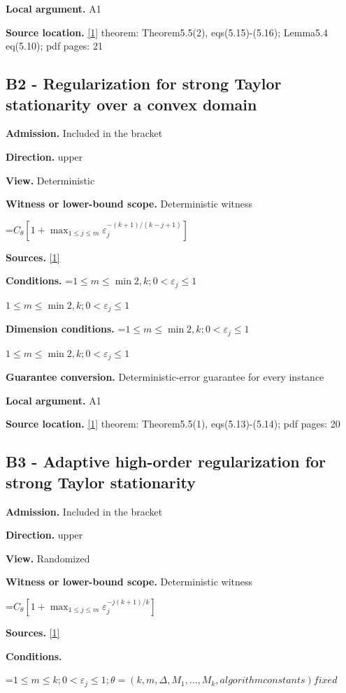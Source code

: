 \documentclass[10pt,a4paper]{article}
\newcommand{\AtlasMath}[1]{\par\begingroup\centering\setbox0=\hbox{$\displaystyle #1$}\ifdim\wd0>1.4\linewidth\typeout{ATLAS WIDE FORMULA: \the\wd0}\fi\ifdim\wd0>\linewidth\resizebox{\linewidth}{!}{\box0}\else\box0\fi\par\endgroup}
\newcommand{\AtlasInlineMath}[1]{\begingroup\setbox0=\hbox{$#1$}\ifdim\wd0>.4\linewidth\endgroup\AtlasMath{#1}\else\endgroup$#1$\fi}
\begin{document}
\textbf{Local argument.} A1

\textbf{Source location.} \href{https://optimization-online.org/wp-content/uploads/2020/01/7590.pdf}{[1]} theorem: Theorem5.5(2), eqs(5.15)-(5.16); Lemma5.4 eq(5.10); pdf pages: 21

\subsection{B2 - Regularization for strong Taylor stationarity over a convex domain}
\textbf{Admission.} Included in the bracket

\textbf{Direction.} upper

\textbf{View.} Deterministic

\textbf{Witness or lower-bound scope.} Deterministic witness

\AtlasMath{C_\theta[1+\max_{1\le j\le m}\varepsilon_j^{-(k+1)/(k-j+1)}]}
\textbf{Sources.} \href{https://optimization-online.org/wp-content/uploads/2020/01/7590.pdf}{[1]}

\textbf{Conditions.} \AtlasInlineMath{1\le m\le \min{2,k};0<\varepsilon_j\le 1}

\textbf{Dimension conditions.} \AtlasInlineMath{1\le m\le \min{2,k};0<\varepsilon_j\le 1}

\textbf{Guarantee conversion.} Deterministic-error guarantee for every instance

\textbf{Local argument.} A1

\textbf{Source location.} \href{https://optimization-online.org/wp-content/uploads/2020/01/7590.pdf}{[1]} theorem: Theorem5.5(1), eqs(5.13)-(5.14); pdf pages: 20

\subsection{B3 - Adaptive high-order regularization for strong Taylor stationarity}
\textbf{Admission.} Included in the bracket

\textbf{Direction.} upper

\textbf{View.} Randomized

\textbf{Witness or lower-bound scope.} Deterministic witness

\AtlasMath{C_\theta[1+\max_{1\le j\le m}\varepsilon_j^{-j(k+1)/k}]}
\textbf{Sources.} \href{https://optimization-online.org/wp-content/uploads/2020/01/7590.pdf}{[1]}

\textbf{Conditions.} 
\AtlasMath{1\le m\le k;0<\varepsilon_j\le 1;\theta=(k,m,\Delta,M_1,\ldots,M_k,algorithm constants) fixed}
\end{document}
